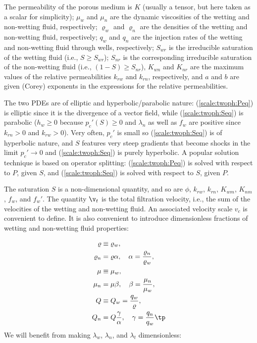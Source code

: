 \documentclass[graybox,envcountchap,sectrefs,final]{svmonodo}
\begin{document}
The permeability of the porous medium is $K$
(usually a tensor, but here taken as a
scalar for simplicity); $\mu_w$ and $\mu_n$ are the dynamic viscosities
of the wetting and non-wetting fluid, respectively;
$\varrho_w$ and $\varrho_n$ are the densities
of the wetting and non-wetting fluid, respectively;
$q_w$ and $q_n$ are the injection rates of the wetting and non-wetting
fluid through wells, respectively;
$S_{wr}$ is the irreducible saturation of
the wetting fluid (i.e., $S\geq S_{wr}$); $S_{nr}$ is the corresponding
irreducible saturation of the non-wetting fluid (i.e., $(1-S)\geq S_{nr}$),
$K_{wn}$ and $K_{nr}$ are the maximum values of the
relative permeabilities $k_{rw}$ and $k_{rn}$, respectively, and
$a$ and $b$ are given (Corey) exponents in the expressions for the
relative permeabilities.

The two PDEs are of elliptic and hyperbolic/parabolic nature:
(\ref{scale:twoph:Peq}) is elliptic since it is the divergence of a
vector field, while (\ref{scale:twoph:Seq}) is parabolic ($h_w\geq 0$
because $p_c'(S)\geq 0$ and $\lambda_n$ as well as $f_w$ are positive
since $k_{rn}>0$ and $k_{rw}>0$). Very often, $p_c'$ is small so
(\ref{scale:twoph:Seq}) is of hyperbolic nature, and $S$ features very
steep gradients that become shocks in the limit $p_c'\rightarrow 0$
and (\ref{scale:twoph:Seq}) is purely hyperbolic.
A popular solution technique is based on operator splitting:
(\ref{scale:twoph:Peq}) is solved with respect to $P$, given $S$, and
(\ref{scale:twoph:Seq}) is solved with respect to $S$, given $P$.

The saturation $S$ is a non-dimensional quantity, and so are $\phi$,
$k_{rw}$, $k_{rn}$, $K_{wm}$, $K_{nm}$, $f_w$, and $f_w'$.
The quantity $\v_t$ is the total filtration velocity, i.e., the
sum of the velocities of the wetting and non-wetting fluid.
An associated velocity scale $v_c$ is convenient to define.
It is also convenient to introduce dimensionless fractions of
wetting and non-wetting fluid properties:

\begin{align*}
\varrho &\equiv \varrho_w,\\ 
\varrho_n &= \varrho\alpha,\quad \alpha = \frac{\varrho_n}{\varrho_w},\\ 
\mu &\equiv\mu_w,\\ 
\mu_n &= \mu\beta,\quad \beta = \frac{\mu_n}{\mu_w},\\ 
Q &\equiv Q_w = \frac{q_w}{\varrho},\\ 
Q_n &= Q\frac{\gamma}{\alpha},\quad \gamma = \frac{q_n}{q_w}\tp
\end{align*}
We will benefit from making $\lambda_w$, $\lambda_n$, and $\lambda_t$
dimensionless:
\end{document}

